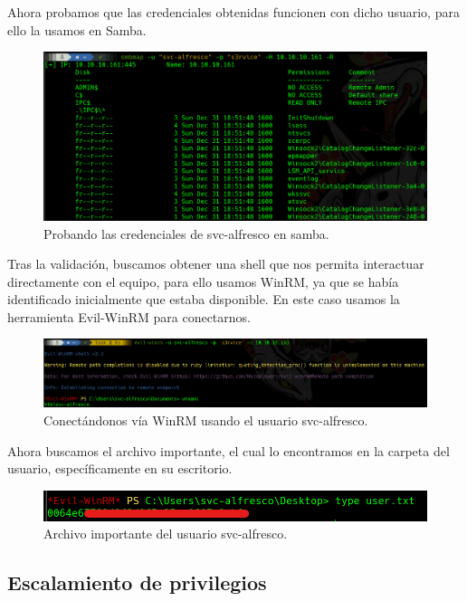 \documentclass{article}
\begin{document}
Ahora probamos que las credenciales obtenidas funcionen con dicho usuario, para ello la usamos en Samba. 

\begin{figure}[H]
	\center
	\includegraphics[width=\textwidth]{images/forest/probando_creds.png}
	\caption{Probando las credenciales de svc-alfresco en samba.}
\end{figure}

Tras la validación, buscamos obtener una shell que nos permita interactuar directamente con el equipo, para ello usamos WinRM, ya que se había identificado inicialmente que estaba disponible. En este caso usamos la herramienta Evil-WinRM para conectarnos.

\begin{figure}[H]
	\center
	\includegraphics[width=\textwidth]{images/forest/conexionConWinRM.png}
	\caption{Conectándonos vía WinRM usando el usuario svc-alfresco.}
\end{figure}

Ahora buscamos el archivo importante, el cual lo encontramos en la carpeta del usuario, específicamente en su escritorio.

\begin{figure}[H]
	\center
	\includegraphics[width=\textwidth]{images/forest/obtenida la hash de alfresco.png}
	\caption{Archivo importante del usuario svc-alfresco.}
\end{figure}


\subsection{Escalamiento de privilegios}
\end{document}
